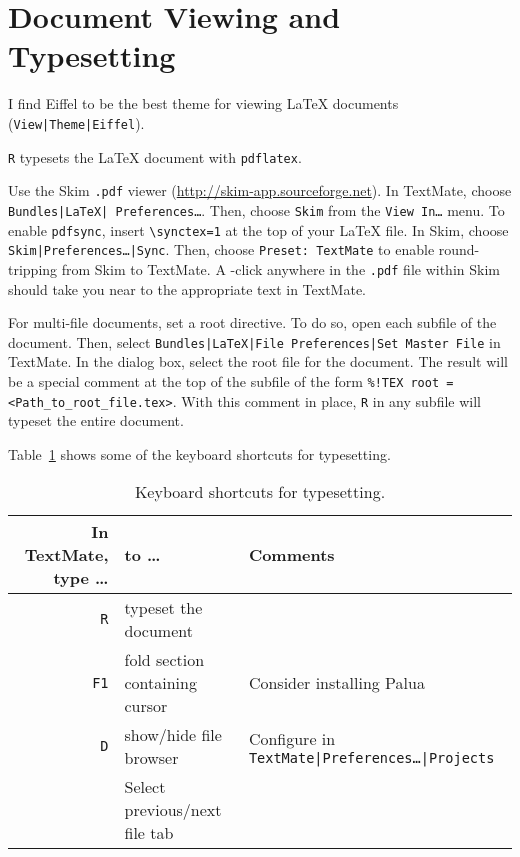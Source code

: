 \documentclass[10pt]{article}
\begin{document}


\section{Document Viewing and Typesetting} %
\label{sec:document_viewing_and_typesetting}
I find Eiffel to be the best theme for viewing \LaTeX{} documents
(\texttt{View|Theme|Eiffel}). 

\cmdkey\texttt{R} typesets the \LaTeX{} document with \texttt{pdflatex}. 

Use the Skim \texttt{.pdf} viewer (\url{http://skim-app.sourceforge.net}).
In TextMate, choose \texttt{Bundles|LaTeX| Preferences\dots}.
Then, choose \texttt{Skim} from the \texttt{View In\dots} menu.
To enable \texttt{pdfsync}, insert \verb!\synctex=1! 
at the top of your \LaTeX{} file.
In Skim, choose \texttt{Skim|Preferences\dots|Sync}. 
Then, choose \texttt{Preset:~TextMate} to enable round-tripping from Skim to TextMate. 
A \cmdkey\shiftkey-click anywhere in the \texttt{.pdf} file within Skim 
should take you near to the appropriate text in TextMate.

For multi-file documents, set a root directive. 
To do so, open each subfile of the document. 
Then, select \texttt{Bundles|LaTeX|File Preferences|Set Master File} in TextMate.
In the dialog box, select the root file for the document. 
The result will be a special comment at the top of the subfile of the form
\verb&%!TEX root = <Path_to_root_file.tex>&.
With this comment in place, \cmdkey\texttt{R} in any subfile will typeset the entire document.

Table~\ref{tab:typesetting_keyboard_shortcuts} shows some of the keyboard shortcuts for typesetting.

\begin{table}
\centering
\caption{Keyboard shortcuts for typesetting.}
\begin{tabular}{r|l|l}
	In TextMate, type \dots & to \dots      & Comments                  \\
	\hline
	\cmdkey\texttt{R}           & typeset the document            &                           \\
	\texttt{F1}                 & fold section containing cursor  & Consider installing Palua \\
	\ctlkey\optkey\cmdkey\texttt{D}&show/hide file browser        & Configure in \texttt{TextMate|Preferences\dots|Projects} \\
	\cmdkey\shiftkey [, \cmdkey\shiftkey ] & Select previous/next file tab  &          \\
	
\end{tabular}
\label{tab:typesetting_keyboard_shortcuts}
\end{table}
\end{document}
